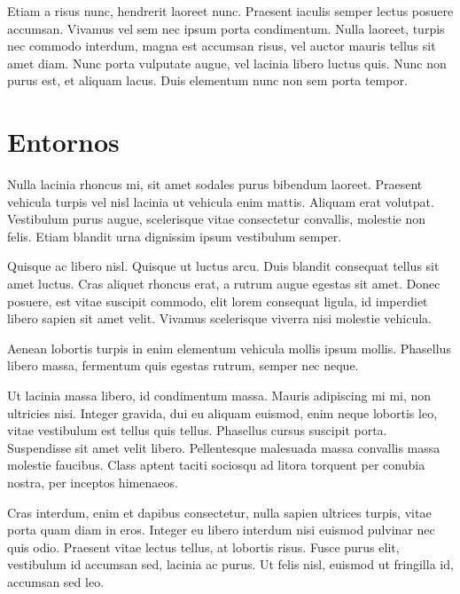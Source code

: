 \documentclass[12pt,a4paper]{report}
\begin{document}
Etiam a risus nunc, hendrerit laoreet nunc. Praesent iaculis semper lectus posuere accumsan. Vivamus vel sem nec ipsum porta condimentum. Nulla laoreet, turpis nec commodo interdum, magna est accumsan risus, vel auctor mauris tellus sit amet diam. Nunc porta vulputate augue, vel lacinia libero luctus quis. Nunc non purus est, et aliquam lacus. Duis elementum nunc non sem porta tempor.





\section{Entornos}
\label{seccion.entornos}



Nulla lacinia rhoncus mi, sit amet sodales purus bibendum laoreet. Praesent vehicula turpis vel nisl lacinia ut vehicula enim mattis. Aliquam erat volutpat. Vestibulum purus augue, scelerisque vitae consectetur convallis, molestie non felis. Etiam blandit urna dignissim ipsum vestibulum semper.

Quisque ac libero nisl. Quisque ut luctus arcu. Duis blandit consequat tellus sit amet luctus. Cras aliquet rhoncus erat, a rutrum augue egestas sit amet. Donec posuere, est vitae suscipit commodo, elit lorem consequat ligula, id imperdiet libero sapien sit amet velit. Vivamus scelerisque viverra nisi molestie vehicula. 

Aenean lobortis turpis in enim elementum vehicula mollis ipsum mollis. Phasellus libero massa, fermentum quis egestas rutrum, semper nec neque.

Ut lacinia massa libero, id condimentum massa. Mauris adipiscing mi mi, non ultricies nisi. Integer gravida, dui eu aliquam euismod, enim neque lobortis leo, vitae vestibulum est tellus quis tellus. Phasellus cursus suscipit porta. Suspendisse sit amet velit libero. Pellentesque malesuada massa convallis massa molestie faucibus. Class aptent taciti sociosqu ad litora torquent per conubia nostra, per inceptos himenaeos. 

Cras interdum, enim et dapibus consectetur, nulla sapien ultrices turpis, vitae porta quam diam in eros. Integer eu libero interdum nisi euismod pulvinar nec quis odio. Praesent vitae lectus tellus, at lobortis risus. Fusce purus elit, vestibulum id accumsan sed, lacinia ac purus. Ut felis nisl, euismod ut fringilla id, accumsan sed leo. 
\end{document}
